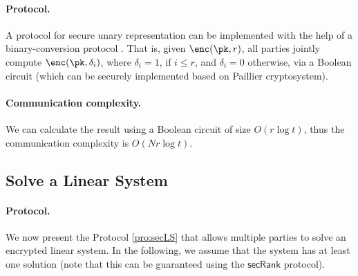   \paragraph{Protocol.} A protocol for secure unary representation can be implemented with the help of a binary-conversion protocol \cite{EC:SchTuy06}. That is, given $\enc(\pk,r)$, all parties jointly compute $\enc(\pk,\delta_i)$, where $\delta_i=1$, if $i\leq r$, and $\delta_i=0$ otherwise, via a Boolean circuit (which can be securely implemented based on Paillier cryptosystem).


 

\paragraph{Communication complexity.} We can calculate the result using a Boolean circuit of size $O(r\log t)$, thus the communication complexity is $O(Nr\log t)$.
 
 
 
 \subsection{Solve a Linear System}
 \label{sec:secLS}



\paragraph{Protocol.} We now present the Protocol \ref{pro:secLS} that allows multiple parties to solve an encrypted linear system. In the following, we assume that the system has at least one solution (note that this can be guaranteed using the $\mathsf{secRank}$ protocol). 

